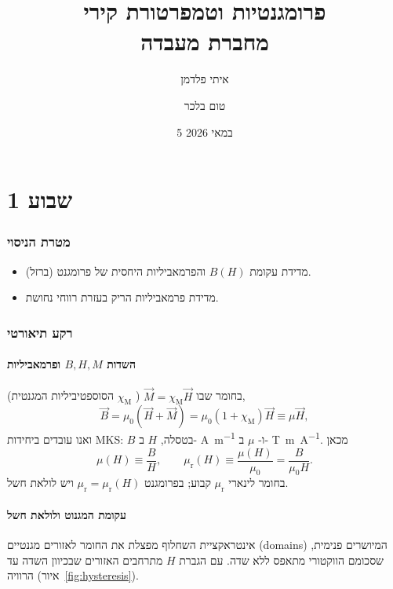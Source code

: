 \documentclass{extarticle}
\begin{document}
\title{\texorpdfstring{פרומגנטיות וטמפרטורת קירי \\[0.4em] \Large מחברת מעבדה}{פרומגנטיות וטמפרטורת קירי — מחברת מעבדה}}
\author{איתי פלדמן \and טום בלכר}
\date{5 במאי 2026}

\maketitle

\tableofcontents
\bigskip

\part{שבוע 1}
\label{part:week1}

\section{מטרת הניסוי}
\begin{itemize}
\item מדידת עקומת
$B(H)$
והפרמאביליות היחסית של פרומגנט (ברזל).
\item מדידת פרמאביליות הריק בעזרת רווחי נחושת.
\end{itemize}

\section{רקע תיאורטי}

\subsection{\texorpdfstring{השדות
$B,H,M$
ופרמאביליות}{השדות
B,H,M
ופרמאביליות}}
בחומר שבו
$\vec{M}=\chi_{\mathrm{M}}\vec{H}$
(
$\chi_{\mathrm{M}}$
הסוספטיביליות המגנטית),
\begin{equation}
\vec{B}=\mu_{0}(\vec{H}+\vec{M})=\mu_{0}(1+\chi_{\mathrm{M}})\vec{H}\equiv\mu\vec{H},
\end{equation}
ואנו עובדים ביחידות
\textenglish{MKS}:
$B$
בטסלה,
$H$
ב-
\si{\ampere\per\meter}
ו-
$\mu$
ב-
\si{\tesla\meter\per\ampere}.
מכאן
\begin{equation}
\mu(H)\equiv\frac{B}{H},\qquad
\mu_{\mathrm{r}}(H)\equiv\frac{\mu(H)}{\mu_{0}}=\frac{B}{\mu_{0}H}.
\end{equation}
בחומר לינארי
$\mu_{\mathrm{r}}$
קבוע; בפרומגנט
$\mu_{\mathrm{r}}=\mu_{\mathrm{r}}(H)$
ויש לולאת חשל.

\subsection{עקומת המגנוט ולולאת חשל}
אינטראקציית השחלוף מפצלת את החומר לאזורים מגנטיים (\textenglish{domains}) המיושרים פנימית, שסכומם הווקטורי מתאפס ללא שדה. עם הגברת
$H$
מתרחבים האזורים שבכיוון השדה עד הרוויה (איור~\ref{fig:hysteresis}).
\end{document}
